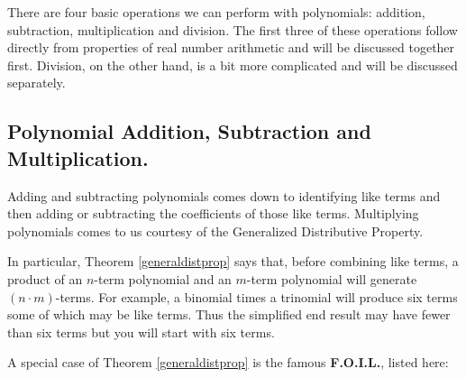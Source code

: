 \smallskip

There are four basic operations we can perform with polynomials:  addition, subtraction, multiplication and division. The first three of these operations follow directly from properties of real number arithmetic and will be discussed together first.  Division, on the other hand, is a bit more complicated and will be discussed separately.

\subsection{Polynomial Addition, Subtraction and Multiplication.}
\label{polyaddsubtmult}

Adding and subtracting polynomials comes down to identifying like terms and then adding or subtracting the coefficients of those like terms.  Multiplying polynomials comes to us courtesy of the Generalized Distributive Property.

\medskip


\medskip

In particular, Theorem \ref{generaldistprop} says that, before combining like terms, a product of an $n$-term polynomial and an $m$-term polynomial will generate $(n \cdot m)$-terms.  For example, a binomial times a trinomial will produce six terms some of which may be like terms.  Thus the simplified end result may have fewer than six terms but you will start with six terms. 

\medskip

A special case of Theorem \ref{generaldistprop}  is the famous \textbf{F.O.I.L.}, listed here:


\medskip

